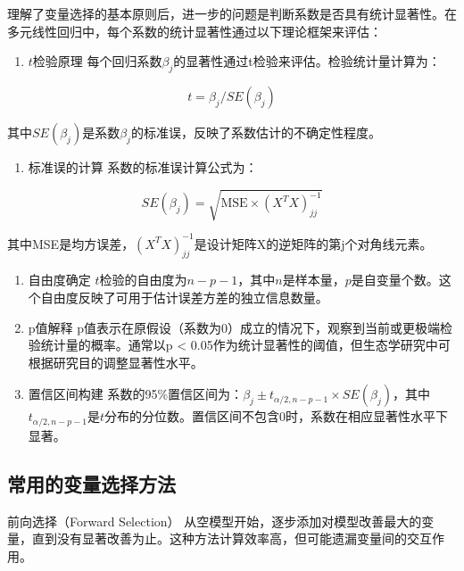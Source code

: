 \documentclass[
  twoside,12pt,fontset=none]{ctexbook}
\providecommand{\tightlist}{%
  \setlength{\itemsep}{0pt}\setlength{\parskip}{0pt}}
\begin{document}
理解了变量选择的基本原则后，进一步的问题是判断系数是否具有统计显著性。在多元线性回归中，每个系数的统计显著性通过以下理论框架来评估：

\begin{enumerate}
\def\labelenumi{\arabic{enumi}.}
\tightlist
\item
  \(t\)检验原理
  每个回归系数\(\beta_j\)的显著性通过t检验来评估。检验统计量计算为：
\end{enumerate}

\[t = \beta_j / SE(\beta_j)\]

其中\(SE(\beta_j)\)是系数\(\beta_j\)的标准误，反映了系数估计的不确定性程度。

\begin{enumerate}
\def\labelenumi{\arabic{enumi}.}
\setcounter{enumi}{1}
\tightlist
\item
  标准误的计算
  系数的标准误计算公式为：
\end{enumerate}

\[SE(\beta_j) = \sqrt{\text{MSE} \times (X^T X)^{-1}_{jj}}\]

其中MSE是均方误差，\((X^T X)^{-1}_{jj}\)是设计矩阵X的逆矩阵的第j个对角线元素。

\begin{enumerate}
\def\labelenumi{\arabic{enumi}.}
\setcounter{enumi}{2}
\item
  自由度确定
  \(t\)检验的自由度为\(n - p - 1\)，其中\(n\)是样本量，\(p\)是自变量个数。这个自由度反映了可用于估计误差方差的独立信息数量。
\item
  p值解释
  p值表示在原假设（系数为0）成立的情况下，观察到当前或更极端检验统计量的概率。通常以p \textless{} 0.05作为统计显著性的阈值，但生态学研究中可根据研究目的调整显著性水平。
\item
  置信区间构建
  系数的95\%置信区间为：\(\beta_j ± t_{\alpha/2, n-p-1} × SE(\beta_j)\)，其中\(t_{\alpha/2, n-p-1}\)是\(t\)分布的分位数。置信区间不包含0时，系数在相应显著性水平下显著。
\end{enumerate}

\hypertarget{ux5e38ux7528ux7684ux53d8ux91cfux9009ux62e9ux65b9ux6cd5}{%
\subsection{常用的变量选择方法}\label{ux5e38ux7528ux7684ux53d8ux91cfux9009ux62e9ux65b9ux6cd5}}

前向选择（Forward Selection）
从空模型开始，逐步添加对模型改善最大的变量，直到没有显著改善为止。这种方法计算效率高，但可能遗漏变量间的交互作用。
\end{document}
